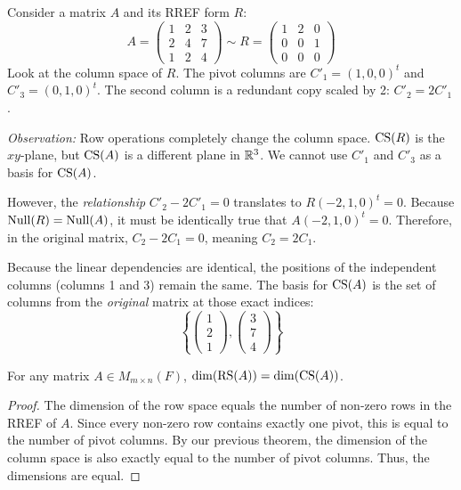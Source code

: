 \documentclass[../linear_algebra_and_groups.tex]{subfiles}
\begin{document}
\begin{example}
    Consider a matrix $A$ and its RREF form $R$:
    \[ A = \begin{pmatrix} 1 & 2 & 3 \\ 2 & 4 & 7 \\ 1 & 2 & 4 \end{pmatrix} \sim R = \begin{pmatrix} 1 & 2 & 0 \\ 0 & 0 & 1 \\ 0 & 0 & 0 \end{pmatrix} \]
    Look at the column space of $R$. The pivot columns are $C'_1 = (1,0,0)^t$ and $C'_3 = (0,1,0)^t$. The second column is a redundant copy scaled by 2: $C'_2 = 2C'_1$.
    
    \textit{Observation:} Row operations completely change the column space. $\operatorname{CS}(R)$ is the $xy$-plane, but $\operatorname{CS}(A)$ is a different plane in $\mathbb{R}^3$. We cannot use $C'_1$ and $C'_3$ as a basis for $\operatorname{CS}(A)$. 
    
    However, the \textit{relationship} $C'_2 - 2C'_1 = 0$ translates to $R(-2, 1, 0)^t = 0$. Because $\operatorname{Null}(R) = \operatorname{Null}(A)$, it must be identically true that $A(-2, 1, 0)^t = 0$. Therefore, in the original matrix, $C_2 - 2C_1 = 0$, meaning $C_2 = 2C_1$. 
    
    Because the linear dependencies are identical, the positions of the independent columns (columns 1 and 3) remain the same. The basis for $\operatorname{CS}(A)$ is the set of columns from the \textit{original} matrix at those exact indices:
    \[ \left\{ \begin{pmatrix} 1 \\ 2 \\ 1 \end{pmatrix}, \begin{pmatrix} 3 \\ 7 \\ 4 \end{pmatrix} \right\} \]
\end{example}

\begin{corollary}
\label{cor:commonrank}
    \begin{shaded*}
        For any matrix $A \in M_{m\times n}(F)$, $\dim(\operatorname{RS}(A)) = \dim(\operatorname{CS}(A))$.
    \end{shaded*}
\end{corollary}
\begin{proof}
    The dimension of the row space equals the number of non-zero rows in the RREF of $A$. Since every non-zero row contains exactly one pivot, this is equal to the number of pivot columns. 
    By our previous theorem, the dimension of the column space is also exactly equal to the number of pivot columns. Thus, the dimensions are equal.
    \qedhere
\end{proof}
\end{document}
